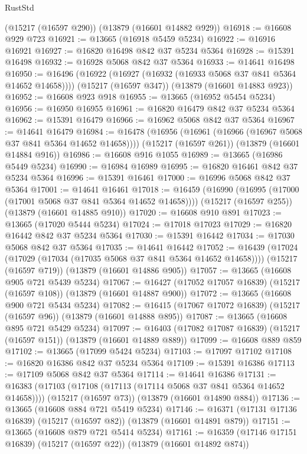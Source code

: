 \begin{lexlean}{RustStd}
\begin{coremodule}
    (@15217 (@16597 @290))
    (@13879 (@16601 @14882 @929))
@16918 := @16608 @929 @723
@16921 := @13665 (@16918 @5459 @5234)
@16922 := @16916 @16921
@16927 := @16820 @16498 @842 @37 @5234 @5364
@16928 := @15391 @16498
@16932 := @16928 @5068 @842 @37 @5364
@16933 := @14641 @16498
@16950 := @16496
    (@16922 (@16927 (@16932 (@16933 @5068 @37 @841 @5364 @14652 @14658))))
    (@15217 (@16597 @347))
    (@13879 (@16601 @14883 @923))
@16952 := @16608 @923 @918
@16955 := @13665 (@16952 @5454 @5234)
@16956 := @16950 @16955
@16961 := @16820 @16479 @842 @37 @5234 @5364
@16962 := @15391 @16479
@16966 := @16962 @5068 @842 @37 @5364
@16967 := @14641 @16479
@16984 := @16478
    (@16956 (@16961 (@16966 (@16967 @5068 @37 @841 @5364 @14652 @14658))))
    (@15217 (@16597 @261))
    (@13879 (@16601 @14884 @916))
@16986 := @16608 @916 @1055
@16989 := @13665 (@16986 @5449 @5234)
@16990 := @16984 @16989
@16995 := @16820 @16461 @842 @37 @5234 @5364
@16996 := @15391 @16461
@17000 := @16996 @5068 @842 @37 @5364
@17001 := @14641 @16461
@17018 := @16459
    (@16990 (@16995 (@17000 (@17001 @5068 @37 @841 @5364 @14652 @14658))))
    (@15217 (@16597 @255))
    (@13879 (@16601 @14885 @910))
@17020 := @16608 @910 @891
@17023 := @13665 (@17020 @5444 @5234)
@17024 := @17018 @17023
@17029 := @16820 @16442 @842 @37 @5234 @5364
@17030 := @15391 @16442
@17034 := @17030 @5068 @842 @37 @5364
@17035 := @14641 @16442
@17052 := @16439
    (@17024 (@17029 (@17034 (@17035 @5068 @37 @841 @5364 @14652 @14658))))
    (@15217 (@16597 @719))
    (@13879 (@16601 @14886 @905))
@17057 := @13665 (@16608 @905 @721 @5439 @5234)
@17067 := @16427 (@17052 @17057 @16839) (@15217 (@16597 @108)) (@13879 (@16601 @14887 @900))
@17072 := @13665 (@16608 @900 @721 @5434 @5234)
@17082 := @16415 (@17067 @17072 @16839) (@15217 (@16597 @96)) (@13879 (@16601 @14888 @895))
@17087 := @13665 (@16608 @895 @721 @5429 @5234)
@17097 := @16403 (@17082 @17087 @16839) (@15217 (@16597 @151)) (@13879 (@16601 @14889 @889))
@17099 := @16608 @889 @859
@17102 := @13665 (@17099 @5424 @5234)
@17103 := @17097 @17102
@17108 := @16820 @16386 @842 @37 @5234 @5364
@17109 := @15391 @16386
@17113 := @17109 @5068 @842 @37 @5364
@17114 := @14641 @16386
@17131 := @16383
    (@17103 (@17108 (@17113 (@17114 @5068 @37 @841 @5364 @14652 @14658))))
    (@15217 (@16597 @73))
    (@13879 (@16601 @14890 @884))
@17136 := @13665 (@16608 @884 @721 @5419 @5234)
@17146 := @16371 (@17131 @17136 @16839) (@15217 (@16597 @82)) (@13879 (@16601 @14891 @879))
@17151 := @13665 (@16608 @879 @721 @5414 @5234)
@17161 := @16359 (@17146 @17151 @16839) (@15217 (@16597 @22)) (@13879 (@16601 @14892 @874))

\end{coremodule}
\end{lexlean}
